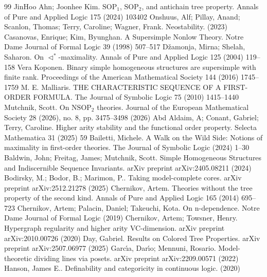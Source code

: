 \documentclass[10pt,a4paper]{amsart}
\begin{document}
\begin{thebibliography}{99}
 JinHoo Ahn; Joonhee Kim. $\mathrm{SOP}_{1}$, $\mathrm{SOP}_{2}$, and antichain tree property. Annals of Pure and Applied Logic 175 (2024) 103402
 Onshuus, Alf; Pillay, Anand; Scanlon, Thomas; Terry, Caroline; Wagner, Frank. Neostability. (2023)
 Casanovas, Enrique; Kim, Byunghan. A Supersimple Nonlow Theory. Notre Dame Journal of Formal Logic 39 (1998) 507--517
 Džamonja, Mirna; Shelah, Saharon. On $\lhd^*$-maximality. Annals of Pure and Applied Logic 125 (2004) 119--158
 Vera Koponen. Binary simple homogeneous structures are supersimple with finite rank. Proceedings of the American Mathematical Society 144 (2016) 1745--1759
 M. E. Malliaris. THE CHARACTERISTIC SEQUENCE OF A FIRST-ORDER FORMULA. The Journal of Symbolic Logic 75 (2010) 1415--1440
 Mutchnik, Scott. On $\mathrm{NSOP}_{2}$ theories. Journal of the European Mathematical Society 28 (2026), no. 8, pp. 3475–3498 (2026)
 Abd Aldaim, A; Conant, Gabriel; Terry, Caroline. Higher arity stability and the functional order property. Selecta Mathematica 31 (2025) 59
 Bailetti, Michele. A Walk on the Wild Side: Notions of maximality in first-order theories. The Journal of Symbolic Logic (2024) 1--30
 Baldwin, John; Freitag, James; Mutchnik, Scott. Simple Homogeneous Structures and Indiscernible Sequence Invariants. arXiv preprint arXiv:2405.08211 (2024)
 Bodirsky, M.; Bodor, B.; Marimon, P.. Taking model-complete cores. arXiv preprint arXiv:2512.21278 (2025)
 Chernikov, Artem. Theories without the tree property of the second kind. Annals of Pure and Applied Logic 165 (2014) 695--723
 Chernikov, Artem; Palacin, Daniel; Takeuchi, Kota. On n-dependence. Notre Dame Journal of Formal Logic (2019)
 Chernikov, Artem; Towsner, Henry. Hypergraph regularity and higher arity VC-dimension. arXiv preprint arXiv:2010.00726 (2020)
 Day, Gabriel. Results on Colored Tree Properties. arXiv preprint arXiv:2507.06977 (2025)
 Garc{\'\i}a, Dar{\'\i}o; Mennuni, Rosario. Model-theoretic dividing lines via posets. arXiv preprint arXiv:2209.00571 (2022)
 Hanson, James E.. Definability and categoricity in continuous logic. (2020)

\end{thebibliography}
\end{document}
